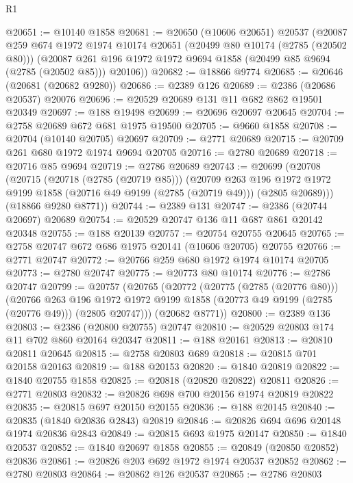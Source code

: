 \begin{lexlean}{R1}
\begin{coremodule}
@20651 := @10140 @1858
@20681 := @20650
    (@10606 @20651)
    @20537
    (@20087
      @259
      @674
      @1972
      @1974
      @10174
      @20651
      (@20499 @80 @10174 (@2785 (@20502 @80)))
      (@20087 @261 @196 @1972 @1972 @9694 @1858 (@20499 @85 @9694 (@2785 (@20502 @85))) @20106))
@20682 := @18866 @9774
@20685 := @20646 (@20681 (@20682 @9280))
@20686 := @2389 @126
@20689 := @2386 (@20686 @20537) @20076
@20696 := @20529 @20689 @131 @11 @682 @862 @19501 @20349
@20697 := @188 @19498
@20699 := @20696 @20697 @20645
@20704 := @2758 @20689 @672 @681 @1975 @19500
@20705 := @9660 @1858
@20708 := @20704 (@10140 @20705) @20697
@20709 := @2771 @20689
@20715 := @20709 @261 @680 @1972 @1974 @9694 @20705
@20716 := @2780 @20689
@20718 := @20716 @85 @9694
@20719 := @2786 @20689
@20743 := @20699
    (@20708
      (@20715
        (@20718 (@2785 (@20719 @85)))
        (@20709
          @263
          @196
          @1972
          @1972
          @9199
          @1858
          (@20716 @49 @9199 (@2785 (@20719 @49)))
          (@2805 @20689)))
      (@18866 @9280 @8771))
@20744 := @2389 @131
@20747 := @2386 (@20744 @20697) @20689
@20754 := @20529 @20747 @136 @11 @687 @861 @20142 @20348
@20755 := @188 @20139
@20757 := @20754 @20755 @20645
@20765 := @2758 @20747 @672 @686 @1975 @20141 (@10606 @20705) @20755
@20766 := @2771 @20747
@20772 := @20766 @259 @680 @1972 @1974 @10174 @20705
@20773 := @2780 @20747
@20775 := @20773 @80 @10174
@20776 := @2786 @20747
@20799 := @20757
    (@20765
      (@20772
        (@20775 (@2785 (@20776 @80)))
        (@20766
          @263
          @196
          @1972
          @1972
          @9199
          @1858
          (@20773 @49 @9199 (@2785 (@20776 @49)))
          (@2805 @20747)))
      (@20682 @8771))
@20800 := @2389 @136
@20803 := @2386 (@20800 @20755) @20747
@20810 := @20529 @20803 @174 @11 @702 @860 @20164 @20347
@20811 := @188 @20161
@20813 := @20810 @20811 @20645
@20815 := @2758 @20803 @689
@20818 := @20815 @701 @20158 @20163
@20819 := @188 @20153
@20820 := @1840 @20819
@20822 := @1840 @20755 @1858
@20825 := @20818 (@20820 @20822) @20811
@20826 := @2771 @20803
@20832 := @20826 @698 @700 @20156 @1974 @20819 @20822
@20835 := @20815 @697 @20150 @20155
@20836 := @188 @20145
@20840 := @20835 (@1840 @20836 @2843) @20819
@20846 := @20826 @694 @696 @20148 @1974 @20836 @2843
@20849 := @20815 @693 @1975 @20147
@20850 := @1840 @20537
@20852 := @1840 @20697 @1858
@20855 := @20849 (@20850 @20852) @20836
@20861 := @20826 @203 @692 @1972 @1974 @20537 @20852
@20862 := @2780 @20803
@20864 := @20862 @126 @20537
@20865 := @2786 @20803

\end{coremodule}
\end{lexlean}
